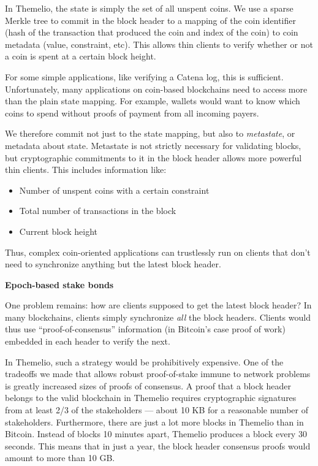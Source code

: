 \documentclass[]{article}
\providecommand{\tightlist}{%
  \setlength{\itemsep}{0pt}\setlength{\parskip}{0pt}}
\begin{document}
In Themelio, the state is simply the set of all unspent coins. We use a
sparse Merkle tree to commit in the block header to a mapping of the
coin identifier (hash of the transaction that produced the coin and
index of the coin) to coin metadata (value, constraint, etc). This
allows thin clients to verify whether or not a coin is spent at a
certain block height.

For some simple applications, like verifying a Catena log, this is
sufficient. Unfortunately, many applications on coin-based blockchains
need to access more than the plain state mapping. For example, wallets
would want to know which coins to spend without proofs of payment from
all incoming payers.

We therefore commit not just to the state mapping, but also to
\emph{metastate}, or metadata about state. Metastate is not strictly
necessary for validating blocks, but cryptographic commitments to it in
the block header allows more powerful thin clients. This includes
information like:

\begin{itemize}
\tightlist
\item
  Number of unspent coins with a certain constraint
\item
  Total number of transactions in the block
\item
  Current block height
\end{itemize}

Thus, complex coin-oriented applications can trustlessly run on clients
that don't need to synchronize anything but the latest block header.

\textbf{Epoch-based stake bonds}

One problem remains: how are clients supposed to get the latest block
header? In many blockchains, clients simply synchronize \emph{all} the
block headers. Clients would thus use ``proof-of-consensus'' information
(in Bitcoin's case proof of work) embedded in each header to verify the
next.

In Themelio, such a strategy would be prohibitively expensive. One of
the tradeoffs we made that allows robust proof-of-stake immune to
network problems is greatly increased sizes of proofs of consensus. A
proof that a block header belongs to the valid blockchain in Themelio
requires cryptographic signatures from at least 2/3 of the stakeholders
--- about 10 KB for a reasonable number of stakeholders. Furthermore,
there are just a lot more blocks in Themelio than in Bitcoin. Instead of
blocks 10 minutes apart, Themelio produces a block every 30 seconds.
This means that in just a year, the block header consensus proofs would
amount to more than 10 GB.
\end{document}

